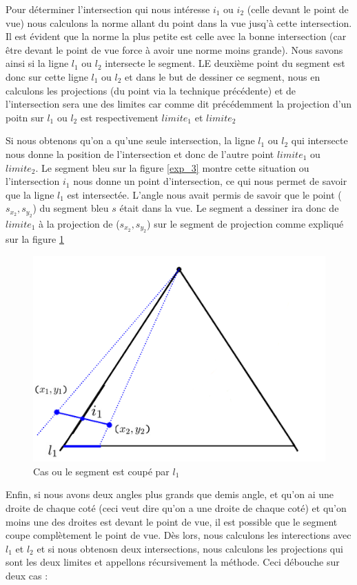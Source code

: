 \documentclass[11pt,a4paper]{article}
\theoremstyle{definition}
\theoremstyle{remark}
\begin{document}
Pour déterminer l'intersection qui nous intéresse $i_1$ ou $i_2$ (celle devant le point de vue)  nous calculons la norme allant du point dans la vue jusq'à cette intersection. Il est évident que la norme la plus petite est celle avec la bonne intersection (car être devant le point de vue force à avoir une norme moins grande). Nous savons ainsi si la ligne $l_1$ ou $l_2$ intersecte le segment. LE deuxième point du segment est donc sur cette ligne $l_1$ ou $l_2$ et dans le but de dessiner ce segment, nous en calculons les projections (du point via la technique précédente) et de l'intersection sera une des limites car comme dit précédemment la projection d'un poitn sur $l_1$ ou $l_2$ est respectivement $limite_1$ et $limite_2$

Si nous obtenons qu'on a qu'une seule intersection, la ligne $l_1$ ou $l_2$ qui intersecte nous donne la position de l'intersection et donc de l'autre point $limite_1$ ou $limite_2$. Le segment bleu sur la figure \ref{exp_3} montre cette situation ou l'intersection $i_1$ nous donne un point d'intersection, ce qui nous permet de savoir que la ligne $l_1$ est intersectée. L'angle nous avait permis de savoir que le point ($s_{x_2},s_{y_2}$) du segment bleu $s$ était dans la vue. Le segment a dessiner ira donc de $limite_1$ à la projection de ($s_{x_2},s_{y_2}$) sur le segment de projection comme expliqué sur la figure \ref{cas2}

\begin{figure}[H]
\centering
\includegraphics[scale=0.6]{cas2.png}
\caption{Cas ou le segment est coupé par $l_1$}
\label{cas2}
\end{figure}

Enfin, si nous avons deux angles plus grands que demis angle, et qu'on ai une droite de chaque coté (ceci veut dire qu'on a une droite de chaque coté) et qu'on moins une des droites est devant le point de vue, il est possible que le segment coupe complètement le point de vue. Dès lors, nous calculons les interections avec $l_1$ et $l_2$ et si nous obtenosn deux intersections, nous calculons les projections qui sont les deux limites et appellons récursivement la méthode. Ceci débouche sur deux cas :
\end{document}
